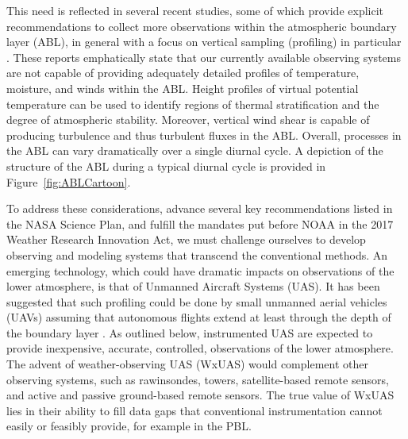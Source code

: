 \documentclass[sensors,review,submit,moreauthors,pdftex,10pt,a4paper]{mdpi}
\theoremstyle{mdpi}
\newcounter{ex}
\newcounter{re}
\theoremstyle{mdpidefinition}
\begin{document}
This need is reflected in several recent studies, some of which provide explicit recommendations to collect more observations within the atmospheric boundary layer (ABL), in general with a focus on vertical sampling (profiling) in particular \citep{NRC2009, hardesty+2012, 2017_2027_DecadalSurvey, NAP25138, geerts++2017_UCAR}. These reports emphatically state that our currently available observing systems are not capable of providing adequately detailed profiles of temperature, moisture, and winds within the ABL. Height profiles of virtual potential temperature can be used to identify regions of thermal stratification and the degree of atmospheric stability. Moreover, vertical wind shear is capable of producing turbulence and thus turbulent fluxes in the ABL. Overall, processes in the ABL can vary dramatically over a single diurnal cycle. A depiction of the structure of the ABL during a typical diurnal cycle is provided in Figure~\ref{fig:ABLCartoon}.

To address these considerations, advance several key recommendations listed in the NASA Science Plan, and fulfill the mandates put before NOAA in the 2017 Weather Research Innovation Act, we must challenge ourselves to develop observing and modeling systems that transcend the conventional methods. An emerging technology, which could have dramatic impacts on observations of the lower atmosphere, is that of Unmanned Aircraft Systems (UAS). It has been suggested that such profiling could be done by small unmanned aerial vehicles (UAVs) assuming that autonomous flights extend at least through the depth of the boundary layer \citep{dabberdt++2005_BAMS}. As outlined below, instrumented UAS are expected to provide inexpensive, accurate, controlled, observations of the lower atmosphere. The advent of weather-observing UAS (WxUAS) would complement other observing systems, such as rawinsondes, towers, satellite-based remote sensors, and active and passive ground-based remote sensors. The true value of WxUAS lies in their ability to fill data gaps that conventional instrumentation cannot easily or feasibly provide, for example in the PBL.
\end{document}
